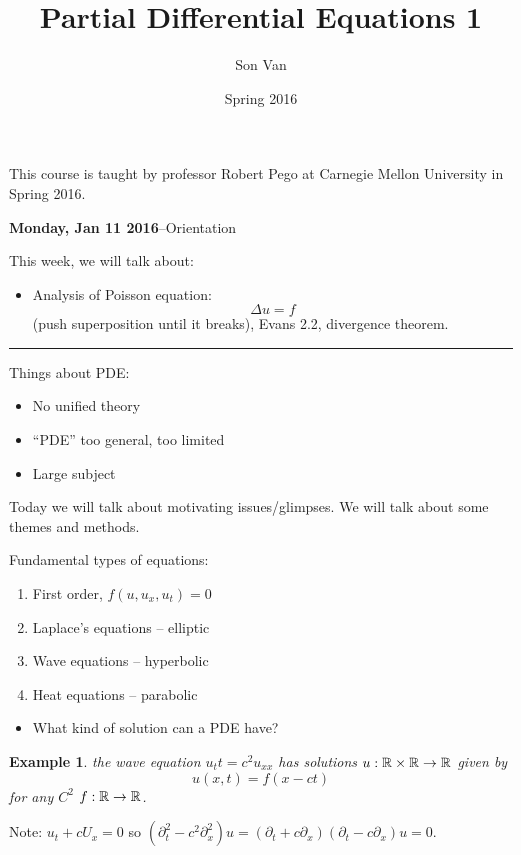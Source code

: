 \documentclass[11pt]{amsart}%
\title{Partial Differential Equations 1}
\author{Son Van}
\date{Spring 2016}
\newtheorem{example}{Example}
\begin{document}
\maketitle

This course is taught by professor Robert Pego at Carnegie Mellon University in Spring 2016.

\textbf{Monday, Jan 11 2016}--Orientation

This week, we will talk about:

\begin{itemize}
\item
  Analysis of Poisson equation: \[\Delta u= f\] (push superposition
  until it breaks), Evans 2.2, divergence theorem.
\end{itemize}

\begin{center}\rule{0.5\linewidth}{\linethickness}\end{center}

Things about PDE:

\begin{itemize}
\item
  No unified theory
\item
  ``PDE'' too general, too limited
\item
  Large subject
\end{itemize}

Today we will talk about motivating issues/glimpses. We will talk about
some themes and methods.

Fundamental types of equations:

\begin{enumerate}
\def\labelenumi{\arabic{enumi}.}
\item
  First order, \(f(u,u_x,u_t)=0\)
\item
  Laplace's equations -- elliptic
\item
  Wave equations -- hyperbolic
\item
  Heat equations -- parabolic
\end{enumerate}

\begin{itemize}
\item
  What kind of solution can a PDE have?
\end{itemize}

\begin{example} the wave equation \(u_tt= c^2u_{xx}\) has solutions
\(u:\mathbb{R}\times \mathbb{R} \to \mathbb{R}\) given by \[u(x,t)=f(x-ct)\] for any \(C^2\)
\(f:\mathbb{R}\to \mathbb{R}\).
\end{example}
Note: \(u_t+cU_x=0\) so
\((\partial_t^2-c^2\partial_x^2)u = (\partial_t+c\partial_x)(\partial_t-c\partial_x)u=0\).
\end{document}
